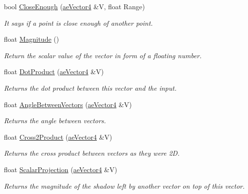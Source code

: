 \begin{DoxyCompactItemize}
\item 
bool \hyperlink{structae_core_1_1ae_vector4_a90f4b6bea38034e2740d51244b945f90}{Close\+Enough} (\hyperlink{structae_core_1_1ae_vector4}{ae\+Vector4} \&V, float Range)
\begin{DoxyCompactList}\small\item\em It says if a point is close enough of another point. \end{DoxyCompactList}\item 
float \hyperlink{structae_core_1_1ae_vector4_ad6bd93ee0f63e9520e8c71ac7277ee74}{Magnitude} ()
\begin{DoxyCompactList}\small\item\em Return the scalar value of the vector in form of a floating number. \end{DoxyCompactList}\item 
float \hyperlink{structae_core_1_1ae_vector4_ab0e0b0a623b897fd92faa76b4a7759ae}{Dot\+Product} (\hyperlink{structae_core_1_1ae_vector4}{ae\+Vector4} \&V)
\begin{DoxyCompactList}\small\item\em Returns the dot product between this vector and the input. \end{DoxyCompactList}\item 
float \hyperlink{structae_core_1_1ae_vector4_ad58a858691a51055b76f6c454122c448}{Angle\+Between\+Vectors} (\hyperlink{structae_core_1_1ae_vector4}{ae\+Vector4} \&V)
\begin{DoxyCompactList}\small\item\em Returns the angle between vectors. \end{DoxyCompactList}\item 
float \hyperlink{structae_core_1_1ae_vector4_a2d44a2548f94fadc03197ae80472dc5c}{Cross2\+Product} (\hyperlink{structae_core_1_1ae_vector4}{ae\+Vector4} \&V)
\begin{DoxyCompactList}\small\item\em Returns the cross product between vectors as they were 2D. \end{DoxyCompactList}\item 
float \hyperlink{structae_core_1_1ae_vector4_a7d21e45b202a9f5f2061b06c842feb83}{Scalar\+Projection} (\hyperlink{structae_core_1_1ae_vector4}{ae\+Vector4} \&V)
\begin{DoxyCompactList}\small\item\em Returns the magnitude of the shadow left by another vector on top of this vector. \end{DoxyCompactList}\item 

\end{DoxyCompactItemize}
